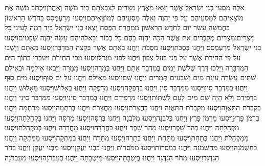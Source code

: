 \documentclass[../main/main.tex]{subfiles}
\begin{document}
\begin{multicols}{\ncols}
אֵלֶּה מַסְעֵי בְנֵי יִשְׂרָאֵל אֲשֶׁר יָצְאוּ מֵאֶרֶץ מִצְרַיִם לְצִבְאֹתָם בְּיַד מֹשֶׁה וְאַהֲרֹן\PreVerseSpace{}וַיִּכְתֹּב מֹשֶׁה אֶת מוֹצָאֵיהֶם לְמַסְעֵיהֶם עַל פִּי יַהְוֶה וְאֵלֶּה מַסְעֵיהֶם לְמוֹצָאֵיהֶם\PreVerseSpace{}וַיִּסְעוּ מֵרַעְמְסֵס בַּחֹדֶשׁ הָרִאשׁוֹן בַּחֲמִשָּׁה עָשָׂר יוֹם לַחֹדֶשׁ הָרִאשׁוֹן מִמָּחֳרַת הַפֶּסַח יָצְאוּ בְנֵי יִשְׂרָאֵל בְּיָד רָמָה לְעֵינֵי כָּל מִצְרָיִם\PreVerseSpace{}וּמִצְרַיִם מְקַבְּרִים אֵת אֲשֶׁר הִכָּה יַהְוֶה בָּהֶם כָּל בְּכוֹר וּבֵאלֹהֵיהֶם עָשָׂה יַהְוֶה שְׁפָטִים\PreVerseSpace{}וַיִּסְעוּ בְנֵי יִשְׂרָאֵל מֵרַעְמְסֵס וַיַּחֲנוּ בְּסֻכֹּת\PreVerseSpace{}וַיִּסְעוּ מִסֻּכֹּת וַיַּחֲנוּ בְאֵתָם אֲשֶׁר בִּקְצֵה הַמִּדְבָּר\PreVerseSpace{}וַיִּסְעוּ מֵאֵתָם וַיָּשֻׁבוּ\SubEnd{} עַל פִּי הַחִירֹת אֲשֶׁר עַל פְּנֵי בַּעַל צְפוֹן וַיַּחֲנוּ לִפְנֵי מִגְדֹּל\PreVerseSpace{}וַיִּסְעוּ מִפִּי\SubEnd{} הַחִירֹת וַיַּעַבְרוּ בְתוֹךְ הַיָּם הַמִּדְבָּרָה וַיֵּלְכוּ דֶּרֶךְ שְׁלֹשֶׁת יָמִים בְּמִדְבַּר אֵתָם וַיַּחֲנוּ בְּמָרָה\PreVerseSpace{}וַיִּסְעוּ מִמָּרָה וַיָּבֹאוּ אֵילִמָה וּבְאֵילִם שְׁתֵּים עֶשְׂרֵה עֵינֹת מַיִם וְשִׁבְעִים תְּמָרִים וַיַּחֲנוּ שָׁם\PreVerseSpace{}וַיִּסְעוּ מֵאֵילִם וַיַּחֲנוּ עַל יַם סוּף\PreVerseSpace{}וַיִּסְעוּ מִיַּם סוּף וַיַּחֲנוּ בְּמִדְבַּר סִין\PreVerseSpace{}וַיִּסְעוּ מִמִּדְבַּר סִין וַיַּחֲנוּ בְּדָפְקָה\PreVerseSpace{}וַיִּסְעוּ מִדָּפְקָה וַיַּחֲנוּ בְּאָלוּשׁ\PreVerseSpace{}וַיִּסְעוּ מֵאָלוּשׁ וַיַּחֲנוּ בִּרְפִידִם וְלֹא הָיָה שָׁם מַיִם לָעָם לִשְׁתּוֹת\PreVerseSpace{}וַיִּסְעוּ מֵרְפִידִם וַיַּחֲנוּ בְּמִדְבַּר סִינָי\PreVerseSpace{}וַיִּסְעוּ מִמִּדְבַּר סִינָי וַיַּחֲנוּ בְּקִבְרֹת הַתַּאֲוָה\PreVerseSpace{}וַיִּסְעוּ מִקִּבְרֹת הַתַּאֲוָה וַיַּחֲנוּ בַּחֲצֵרֹת\PreVerseSpace{}וַיִּסְעוּ מֵחֲצֵרֹת וַיַּחֲנוּ בְּרִתְמָה\PreVerseSpace{}וַיִּסְעוּ מֵרִתְמָה וַיַּחֲנוּ בְּרִמֹּן פָּרֶץ\PreVerseSpace{}וַיִּסְעוּ מֵרִמֹּן פָּרֶץ וַיַּחֲנוּ בְּלִבְנָה\PreVerseSpace{}וַיִּסְעוּ מִלִּבְנָה וַיַּחֲנוּ בְּרִסָּה\PreVerseSpace{}וַיִּסְעוּ מֵרִסָּה וַיַּחֲנוּ בִּקְהֵלָתָה\PreVerseSpace{}וַיִּסְעוּ מִקְּהֵלָתָה וַיַּחֲנוּ בְּהַר שָׁפֶר\PreVerseSpace{}וַיִּסְעוּ מֵהַר שָׁפֶר וַיַּחֲנוּ בַּחֲרָדָה\PreVerseSpace{}וַיִּסְעוּ מֵחֲרָדָה וַיַּחֲנוּ בְּמַקְהֵלֹת\PreVerseSpace{}וַיִּסְעוּ מִמַּקְהֵלֹת וַיַּחֲנוּ בְּתָחַת\PreVerseSpace{}וַיִּסְעוּ מִתָּחַת וַיַּחֲנוּ בְּתָרַח\PreVerseSpace{}וַיִּסְעוּ מִתָּרַח וַיַּחֲנוּ בְּמִתְקָה\PreVerseSpace{}וַיִּסְעוּ מִמִּתְקָה וַיַּחֲנוּ בְּחַשְׁמֹנָה\PreVerseSpace{}וַיִּסְעוּ מֵחַשְׁמֹנָה וַיַּחֲנוּ בְּמֹסֵרוֹת\PreVerseSpace{}וַיִּסְעוּ מִמֹּסֵרוֹת וַיַּחֲנוּ בִּבְנֵי יַעֲקָן\PreVerseSpace{}וַיִּסְעוּ מִבְּנֵי יַעֲקָן וַיַּחֲנוּ בְּחֹר הַגִּדְגָּד\PreVerseSpace{}וַיִּסְעוּ מֵחֹר הַגִּדְגָּד וַיַּחֲנוּ בְּיָטְבָתָה\PreVerseSpace{}וַיִּסְעוּ מִיָּטְבָתָה וַיַּחֲנוּ בְּעַבְרֹנָה\PreVerseSpace{}וַיִּסְעוּ מֵעַבְרֹנָה 
\end{multicols}
\end{document}
